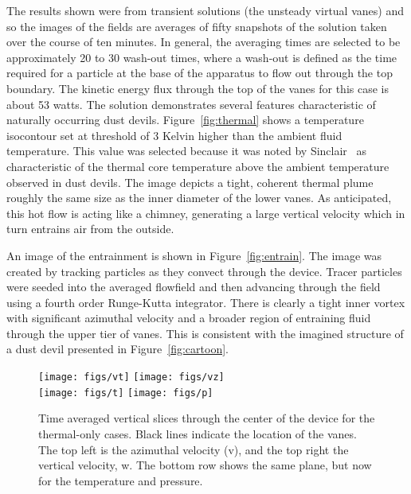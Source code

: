 The results shown were from transient solutions (the unsteady virtual
vanes) and so the images of the fields are averages of fifty snapshots
of the solution taken over the course of ten minutes. In general, the
averaging times are selected to be approximately 20 to 30 wash-out
times, where a wash-out is defined as the time required for a particle
at the base of the apparatus to flow out through the top boundary. The
kinetic energy flux through the top of the vanes for this case is about
53 watts. The solution demonstrates several features characteristic of
naturally occurring dust devils. Figure~\ref{fig:thermal} shows a
temperature isocontour set at threshold of 3 Kelvin higher than the
ambient fluid temperature. This value was selected because it was noted
by Sinclair~\cite{Sinclair1969} as characteristic of the thermal core 
temperature above the ambient temperature observed in dust devils. The
image depicts a tight, coherent thermal plume roughly the same size as
the inner diameter of the lower vanes. As anticipated, this hot flow is
acting like a chimney, generating a large vertical velocity which in
turn entrains air from the outside.  

An image of the entrainment is shown in Figure~\ref{fig:entrain}. The
image was created by tracking particles as they convect through the
device. Tracer particles were seeded into the averaged flowfield and
then advancing through the field using a fourth order Runge-Kutta integrator.  
There is clearly a tight inner vortex with significant azimuthal
velocity and a broader region of entraining fluid through the upper tier
of vanes. This is consistent with the imagined structure of a dust devil
presented in Figure~\ref{fig:cartoon}.    

\begin{figure}[htb]

 \centering
 \texttt{[image: figs/vt]}
 \hfill
  \texttt{[image: figs/vz]}
 \\
  \centering
  \texttt{[image: figs/t]}
 \hfill
 \texttt{[image: figs/p]}
 \caption{Time averaged vertical slices through the center of the device
 for the thermal-only cases. Black lines indicate the location of the
 vanes. The top left is the azimuthal velocity (v), and the top right
 the vertical velocity, w. The bottom row shows the same plane, but now for the
 temperature and pressure.} 
 \label{fig:to-vert}
\end{figure}

